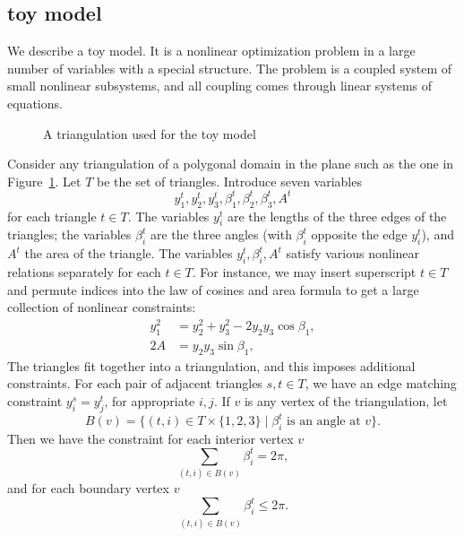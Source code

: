\subsection{toy model}

We describe a toy model.  It is a nonlinear optimization problem in a large
number of variables with a special structure.  The problem is a coupled
system of small nonlinear subsystems, and all coupling comes through linear
systems of equations.

\begin{figure}[htb]
  \centering
  \caption{A triangulation used for the toy model}
  \label{fig:toy}
\end{figure}

Consider any triangulation of a polygonal domain in the plane such as the one
in Figure~\ref{fig:toy}. 
Let $T$ be the set of triangles.  Introduce seven variables 
  $$y^t_1,y^t_2,y^t_3,\beta_1^t,\beta_2^t,\beta_3^t,A^t$$
for each triangle $t\in T$.  The variables $y_i^t$ are the lengths of the three
edges of the triangles; the variables $\beta_i^t$ are the three angles (with
$\beta_i^t$ opposite the edge $y_i^t$), and $A^t$ the area of the triangle.
The variables $y_i^t,\beta_i^t,A^t$ satisfy various nonlinear relations separately for each $t\in T$.
For instance, we may insert superscript $t\in T$ and permute indices into the 
law of cosines and area formula to get a large collection of nonlinear constraints:
   \begin{equation}\label{eqn:loc}
   \begin{array}{lll}
   y_1^2 &= y_2^2 + y_3^2 - 2 y_2 y_3 \cos\beta_1,\\
   2 A &= y_2 y_3 \sin\beta_1,
   \end{array}
   \end{equation}
The triangles fit together into a triangulation, and this imposes additional constraints.
For each pair of adjacent triangles $s,t\in T$, we have an edge matching constraint
$y^s_i = y^t_j$, for appropriate $i,j$.  If $v$ is any vertex of the triangulation, let
   $$
   B(v) = \{(t,i)\in T\times \{1,2,3\} \mid \beta^t_i \text{ is an angle at } v \}.
   $$
Then we have the constraint for each interior vertex $v$
   \begin{equation}\label{eqn:toy1}
   \sum_{(t,i)\in B(v)} \beta^t_i = 2\pi,
   \end{equation}
and for each boundary vertex $v$
   \begin{equation}\label{eqn:toy2}
   \sum_{(t,i)\in B(v)}\beta^t_i \le 2\pi.
   \end{equation}

